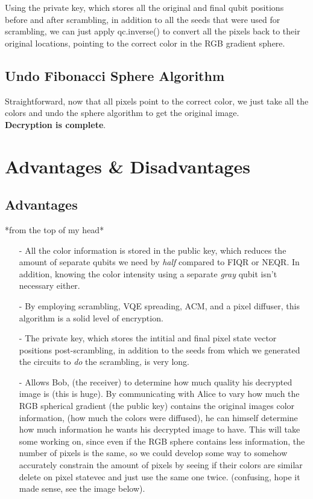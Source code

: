 \documentclass[svgnames]{article}     %
\begin{document}
Using the private key, which stores all the original and final qubit positions
before and after scrambling,
in addition to all the seeds that were used for scrambling, we can just apply
qc.inverse() to convert all the pixels back to their original locations,
pointing to the correct color in the RGB gradient sphere. 

\subsection{Undo Fibonacci Sphere Algorithm}

Straightforward, now that all pixels point to the correct color, we just take
all the colors and undo the sphere algorithm to get the original image. \\

\textbf{Decryption is complete}. 


\section{Advantages \& Disadvantages}

\subsection{Advantages}

*from the top of my head*\\ 

\begin{itemize}
  \item[-] All the color information is stored in the public key, which reduces
    the amount of separate qubits we need by \textit{half} compared to FIQR or NEQR. In
    addition, knowing the color intensity using a separate \textit{gray} qubit
    isn't necessary either. 
  \item[-] By employing scrambling, VQE spreading, ACM, and a pixel diffuser, this
    algorithm is a solid level of encryption. 
  \item[-] The private key, which stores the intitial and final pixel state vector
    positions post-scrambling, in addition to the seeds from which we generated
    the circuits to \textit{do} the scrambling, is very long. 
  \item[-] Allows Bob, (the receiver) to determine how much quality his decrypted
    image is (this is huge). By communicating with Alice to vary how much the RGB spherical gradient
    (the public key) contains the original images color information, (how much
    the colors were diffused), he can himself determine how much information he
    wants his decrypted image to have. This will take some working on, since
    even if the RGB sphere contains less information, the number of pixels is
    the same, so we could develop some way to somehow accurately constrain the
    amount of pixels by seeing if their colors are similar delete on pixel
    statevec and just use the same one twice. (confusing, hope it made sense,
    see the image below).
\end{itemize}
\end{document}

